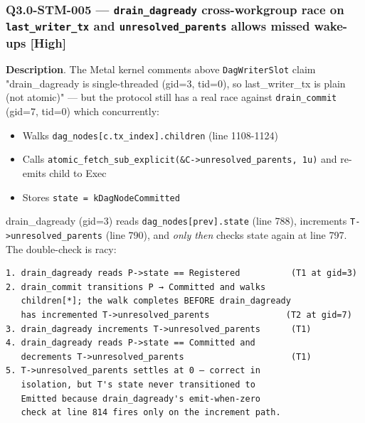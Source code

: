 \documentclass[
]{article}
\providecommand{\tightlist}{%
  \setlength{\itemsep}{0pt}\setlength{\parskip}{0pt}}
\begin{document}
\subsubsection{\texorpdfstring{Q3.0-STM-005 --- \texttt{drain\_dagready}
cross-workgroup race on \texttt{last\_writer\_tx} and
\texttt{unresolved\_parents} allows missed wake-ups
{[}High{]}}{Q3.0-STM-005 --- drain\_dagready cross-workgroup race on last\_writer\_tx and unresolved\_parents allows missed wake-ups {[}High{]}}}\label{q30-stm-005--drain_dagready-cross-workgroup-race-on-last_writer_tx-and-unresolved_parents-allows-missed-wake-ups-high}

\textbf{Description}. The Metal kernel comments above
\texttt{DagWriterSlot} claim "drain\_dagready is single-threaded (gid=3,
tid=0), so last\_writer\_tx is plain (not atomic)" --- but the protocol
still has a real race against \texttt{drain\_commit} (gid=7, tid=0)
which concurrently:

\begin{itemize}
\tightlist
\item
  Walks \texttt{dag\_nodes{[}c.tx\_index{]}.children} (line 1108-1124)
\item
  Calls
  \texttt{atomic\_fetch\_sub\_explicit(\&C-\textgreater{}unresolved\_parents,\ 1u)}
  and re-emits child to Exec
\item
  Stores \texttt{state\ =\ kDagNodeCommitted}
\end{itemize}

drain\_dagready (gid=3) reads \texttt{dag\_nodes{[}prev{]}.state} (line
788), increments \texttt{T-\textgreater{}unresolved\_parents} (line
790), and \emph{only then} checks state again at line 797. The
double-check is racy:

\begin{verbatim}
1. drain_dagready reads P->state == Registered          (T1 at gid=3)
2. drain_commit transitions P → Committed and walks
   children[*]; the walk completes BEFORE drain_dagready
   has incremented T->unresolved_parents               (T2 at gid=7)
3. drain_dagready increments T->unresolved_parents      (T1)
4. drain_dagready reads P->state == Committed and 
   decrements T->unresolved_parents                     (T1)
5. T->unresolved_parents settles at 0 — correct in
   isolation, but T's state never transitioned to 
   Emitted because drain_dagready's emit-when-zero 
   check at line 814 fires only on the increment path.
\end{verbatim}
\end{document}
